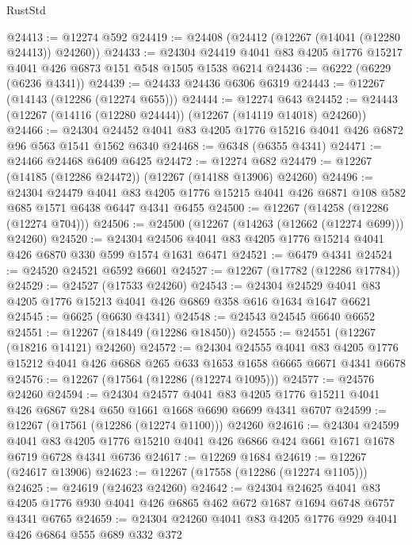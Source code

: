 \begin{lexlean}{RustStd}
\begin{coremodule}
@24413 := @12274 @592
@24419 := @24408 (@24412 (@12267 (@14041 (@12280 @24413)) @24260))
@24433 := @24304 @24419 @4041 @83 @4205 @1776 @15217 @4041 @426 @6873 @151 @548 @1505 @1538 @6214
@24436 := @6222 (@6229 (@6236 @4341))
@24439 := @24433 @24436 @6306 @6319
@24443 := @12267 (@14143 (@12286 (@12274 @655)))
@24444 := @12274 @643
@24452 := @24443 (@12267 (@14116 (@12280 @24444)) (@12267 (@14119 @14018) @24260))
@24466 := @24304 @24452 @4041 @83 @4205 @1776 @15216 @4041 @426 @6872 @96 @563 @1541 @1562 @6340
@24468 := @6348 (@6355 @4341)
@24471 := @24466 @24468 @6409 @6425
@24472 := @12274 @682
@24479 := @12267 (@14185 (@12286 @24472)) (@12267 (@14188 @13906) @24260)
@24496 := @24304
    @24479
    @4041
    @83
    @4205
    @1776
    @15215
    @4041
    @426
    @6871
    @108
    @582
    @685
    @1571
    @6438
    @6447
    @4341
    @6455
@24500 := @12267 (@14258 (@12286 (@12274 @704)))
@24506 := @24500 (@12267 (@14263 (@12662 (@12274 @699))) @24260)
@24520 := @24304 @24506 @4041 @83 @4205 @1776 @15214 @4041 @426 @6870 @330 @599 @1574 @1631 @6471
@24521 := @6479 @4341
@24524 := @24520 @24521 @6592 @6601
@24527 := @12267 (@17782 (@12286 @17784))
@24529 := @24527 (@17533 @24260)
@24543 := @24304 @24529 @4041 @83 @4205 @1776 @15213 @4041 @426 @6869 @358 @616 @1634 @1647 @6621
@24545 := @6625 (@6630 @4341)
@24548 := @24543 @24545 @6640 @6652
@24551 := @12267 (@18449 (@12286 @18450))
@24555 := @24551 (@12267 (@18216 @14121) @24260)
@24572 := @24304
    @24555
    @4041
    @83
    @4205
    @1776
    @15212
    @4041
    @426
    @6868
    @265
    @633
    @1653
    @1658
    @6665
    @6671
    @4341
    @6678
@24576 := @12267 (@17564 (@12286 (@12274 @1095)))
@24577 := @24576 @24260
@24594 := @24304
    @24577
    @4041
    @83
    @4205
    @1776
    @15211
    @4041
    @426
    @6867
    @284
    @650
    @1661
    @1668
    @6690
    @6699
    @4341
    @6707
@24599 := @12267 (@17561 (@12286 (@12274 @1100))) @24260
@24616 := @24304
    @24599
    @4041
    @83
    @4205
    @1776
    @15210
    @4041
    @426
    @6866
    @424
    @661
    @1671
    @1678
    @6719
    @6728
    @4341
    @6736
@24617 := @12269 @1684
@24619 := @12267 (@24617 @13906)
@24623 := @12267 (@17558 (@12286 (@12274 @1105)))
@24625 := @24619 (@24623 @24260)
@24642 := @24304
    @24625
    @4041
    @83
    @4205
    @1776
    @930
    @4041
    @426
    @6865
    @462
    @672
    @1687
    @1694
    @6748
    @6757
    @4341
    @6765
@24659 := @24304
    @24260
    @4041
    @83
    @4205
    @1776
    @929
    @4041
    @426
    @6864
    @555
    @689
    @332
    @372

\end{coremodule}
\end{lexlean}
